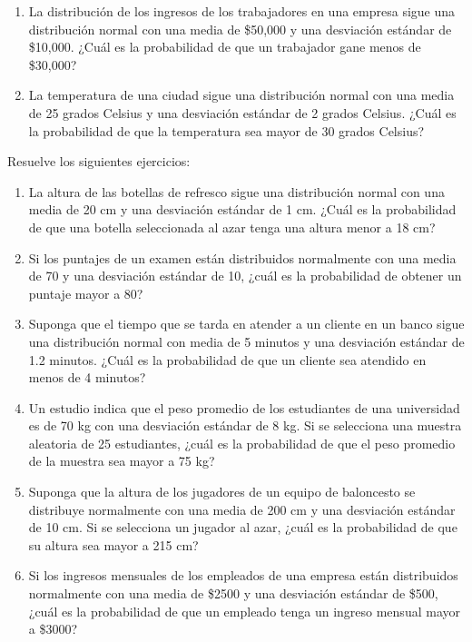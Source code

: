 \begin{Ejer}
\begin{enumerate}
    \item La distribución de los ingresos de los trabajadores en una empresa sigue una distribución normal con una media de \$50,000 y una desviación estándar de \$10,000. ¿Cuál es la probabilidad de que un trabajador gane menos de \$30,000?

    \item La temperatura de una ciudad sigue una distribución normal con una media de 25 grados Celsius y una desviación estándar de 2 grados Celsius. ¿Cuál es la probabilidad de que la temperatura sea mayor de 30 grados Celsius?
\end{enumerate}
\end{Ejer}


\begin{Ejer}
Resuelve los siguientes ejercicios:

\begin{enumerate}
    \item La altura de las botellas de refresco sigue una distribución normal con una media de 20 cm y una desviación estándar de 1 cm. ¿Cuál es la probabilidad de que una botella seleccionada al azar tenga una altura menor a 18 cm?

    \item Si los puntajes de un examen están distribuidos normalmente con una media de 70 y una desviación estándar de 10, ¿cuál es la probabilidad de obtener un puntaje mayor a 80?

    \item Suponga que el tiempo que se tarda en atender a un cliente en un banco sigue una distribución normal con media de 5 minutos y una desviación estándar de 1.2 minutos. ¿Cuál es la probabilidad de que un cliente sea atendido en menos de 4 minutos?

    \item Un estudio indica que el peso promedio de los estudiantes de una universidad es de 70 kg con una desviación estándar de 8 kg. Si se selecciona una muestra aleatoria de 25 estudiantes, ¿cuál es la probabilidad de que el peso promedio de la muestra sea mayor a 75 kg?

    \item Suponga que la altura de los jugadores de un equipo de baloncesto se distribuye normalmente con una media de 200 cm y una desviación estándar de 10 cm. Si se selecciona un jugador al azar, ¿cuál es la probabilidad de que su altura sea mayor a 215 cm?

    \item Si los ingresos mensuales de los empleados de una empresa están distribuidos normalmente con una media de \$2500 y una desviación estándar de \$500, ¿cuál es la probabilidad de que un empleado tenga un ingreso mensual mayor a \$3000?


\end{enumerate}
\end{Ejer}
